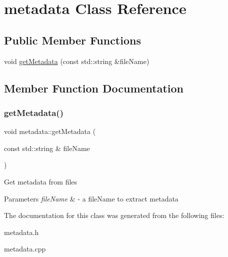 \hypertarget{classmetadata}{}\section{metadata Class Reference}
\label{classmetadata}
\subsection*{Public Member Functions}
\begin{DoxyCompactItemize}
\item 
void \hyperlink{classmetadata_ab1dd82670bdb31c3d49360d93e5cf2a1}{get\+Metadata} (const std\+::string \&file\+Name)
\end{DoxyCompactItemize}


\subsection{Member Function Documentation}
\mbox{\label{classmetadata_ab1dd82670bdb31c3d49360d93e5cf2a1}} 
\subsubsection{\texorpdfstring{get\+Metadata()}{getMetadata()}}
{\footnotesize\ttfamily void metadata\+::get\+Metadata (\begin{DoxyParamCaption}\item[{const std\+::string \&}]{file\+Name }\end{DoxyParamCaption})}

Get metadata from files 
\begin{DoxyParams}{Parameters}
{\em file\+Name} & -\/ a file\+Name to extract metadata \\
\hline
\end{DoxyParams}


The documentation for this class was generated from the following files\+:\begin{DoxyCompactItemize}
\item 
metadata.\+h\item 
metadata.\+cpp\end{DoxyCompactItemize}

